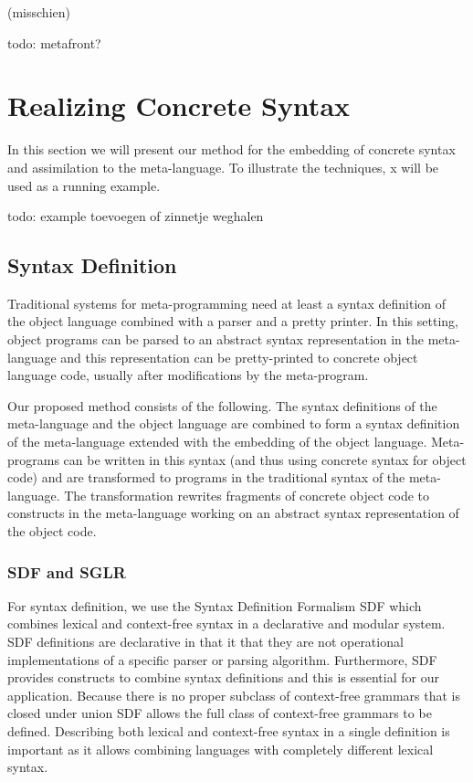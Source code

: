 \documentclass[a4paper,11pt]{article}
\begin{document}
(misschien)

todo: metafront?


\section{Realizing Concrete Syntax}

In this section we will present our method for the embedding of concrete
syntax and assimilation to the meta-language. To illustrate the techniques,
x will be used as a running example.

todo: example toevoegen of zinnetje weghalen


\subsection{Syntax Definition}

Traditional systems for meta-programming need at least a syntax definition
of the object language combined with a parser and a pretty printer. In this
setting, object programs can be parsed to an abstract syntax representation
in the meta-language and this representation can be pretty-printed to
concrete object language code, usually after modifications by the meta-program.

Our proposed method consists of the following. The syntax definitions of the
meta-language and the object language are combined to form a syntax definition
of the meta-language extended with the embedding of the object language.
Meta-programs can be written in this syntax (and thus using concrete syntax
for object code) and are transformed to programs in the traditional syntax of
the meta-language. The transformation rewrites fragments of concrete object
code to constructs in the meta-language working on an abstract syntax representation
of the object code.

\subsubsection*{SDF and SGLR}

For syntax definition, we use the Syntax Definition Formalism SDF which combines
lexical and context-free syntax in a declarative and modular system. SDF definitions
are declarative in that it that they are not operational implementations of a
specific parser or parsing algorithm. Furthermore, SDF provides constructs to
combine syntax definitions and this is essential for our application. Because
there is no proper subclass of context-free grammars that is closed under union
SDF allows the full class of context-free grammars to be defined. Describing
both lexical and context-free syntax in a single definition is important as it
allows combining languages with completely different lexical syntax.
\end{document}
